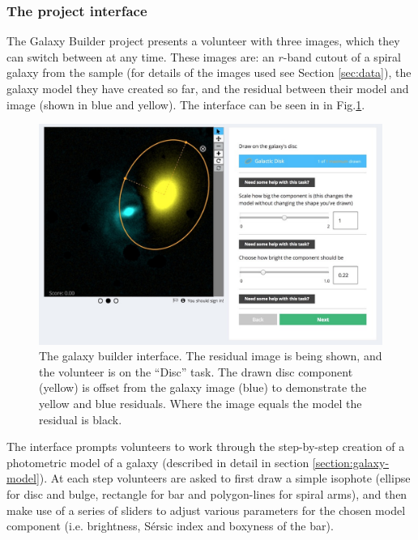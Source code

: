 \documentclass[../main.tex]{subfiles}
\begin{document}

\subsubsection{The project interface}

The Galaxy Builder project presents a volunteer with three images, which they can switch between at any time. These images are: an $r$-band cutout of a spiral galaxy from the sample (for details of the images used see Section \ref{sec:data}), the galaxy model they have created so far, and the residual between their model and image (shown in blue and yellow). The interface can be seen in in Fig.\ref{fig:interfaceInProgress}.

\begin{figure}
  \includegraphics[width=17.7cm]{images/interfaceInProgress.jpg}
  \caption{The galaxy builder interface. The residual image is being shown, and the volunteer is on the ``Disc'' task. The drawn disc component (yellow) is offset from the galaxy image (blue) to demonstrate the yellow and blue residuals. Where the image equals the model the residual is black.}
  \label{fig:interfaceInProgress}
\end{figure}

The interface prompts volunteers to work through the step-by-step creation of a photometric model of a galaxy (described in detail in section \ref{section:galaxy-model}). At each step volunteers are asked to first draw a simple isophote (ellipse for disc and bulge, rectangle for bar and polygon-lines for spiral arms), and then make use of a series of sliders to adjust various parameters for the chosen model component (i.e. brightness, S\'ersic index and boxyness of the bar).
\end{document}

